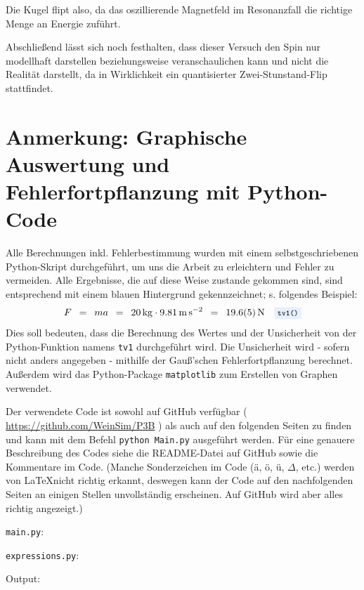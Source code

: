 \documentclass{article}
\newcommand{\widespace}{\enspace}
\newcommand{\wideeq}{\widespace = \widespace}
\newcommand{\coderef}[1]{%
    \text{\footnotesize \colorbox{codebg}{\texttt{#1()}}}%
}
\newcommand{\githuburl}{
    \url{https://github.com/WeinSim/P3B}
}
\begin{document}
Die Kugel flipt also, da das oszillierende Magnetfeld im Resonanzfall die richtige Menge an Energie zuführt.

Abschließend lässt sich noch festhalten, dass dieser Versuch den Spin nur modellhaft darstellen beziehungsweise veranschaulichen kann und nicht die Realität darstellt, da in Wirklichkeit ein quantisierter Zwei-Stunstand-Flip stattfindet.

\newpage


\section{Anmerkung: Graphische Auswertung und Fehlerfortpflanzung mit Python-Code}

Alle Berechnungen inkl. Fehlerbestimmung wurden mit einem selbstgeschriebenen
Python-Skript durchgeführt, um uns die Arbeit zu erleichtern und Fehler zu
vermeiden. Alle Ergebnisse, die auf diese Weise zustande gekommen sind,
sind entsprechend mit einem \colorbox{codebg}{blauen Hintergrund} gekennzeichnet;
s. folgendes Beispiel:
\[
    F \wideeq ma \wideeq \qty{20}{\kg} \cdot \qty{9.81}{\meter\per\square\second}
    \wideeq \qty{19.6 \pm 0.5}{\newton} \quad \coderef{tv1}
\]
Dies soll bedeuten, dass die Berechnung des Wertes und der Unsicherheit von der
Python-Funktion namens \verb|tv1| durchgeführt wird.
Die Unsicherheit wird - sofern nicht anders angegeben - mithilfe der Gauß'schen
Fehlerfortpflanzung berechnet.
Außerdem wird das Python-Package \texttt{matplotlib} zum Erstellen
von Graphen verwendet.

Der verwendete Code ist sowohl auf GitHub verfügbar (\githuburl) als auch auf den
folgenden Seiten zu finden und kann mit dem Befehl \texttt{python Main.py}
ausgeführt werden. Für eine genauere Beschreibung des Codes siehe die README-Datei
auf GitHub sowie die Kommentare im Code.
(Manche Sonderzeichen im Code (ä, ö, ü, $\Delta$, etc.) werden von \LaTeX nicht
richtig erkannt, deswegen kann der Code auf den nachfolgenden Seiten an einigen
Stellen unvollständig erscheinen. Auf GitHub wird aber alles richtig angezeigt.)

\newpage


\verb|main.py|:

\newpage

\verb|expressions.py|:

\newpage

Output:

\end{document}
